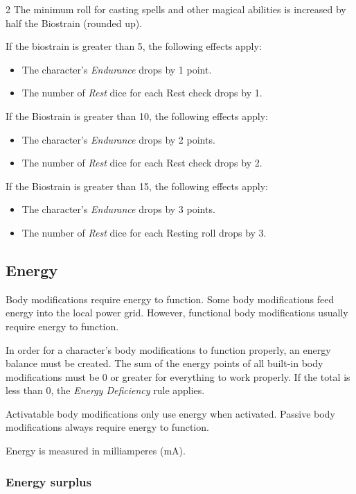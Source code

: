 \begin{multicols}{2}
The minimum roll for casting spells and other magical abilities is increased by half the Biostrain (rounded up).

If the biostrain is greater than 5, the following effects apply:
\begin{itemize}
    \item The character's \textit{Endurance} drops by 1 point.
    \item The number of \textit{Rest} dice for each Rest check drops by 1.
\end{itemize}

If the Biostrain is greater than 10, the following effects apply:
\begin{itemize}
    \item The character's \textit{Endurance} drops by 2 points.
    \item The number of \textit{Rest} dice for each Rest check drops by 2.
\end{itemize}

If the Biostrain is greater than 15, the following effects apply:
\begin{itemize}
    \item The character's \textit{Endurance} drops by 3 points.
    \item The number of \textit{Rest} dice for each Resting roll drops by 3.
\end{itemize}

\subsection{Energy}

Body modifications require energy to function. Some body modifications feed energy into the local power grid. However, functional body modifications usually require energy to function.

In order for a character's body modifications to function properly, an energy balance must be created. The sum of the energy points of all built-in body modifications must be 0 or greater for everything to work properly. If the total is less than 0, the \textit{Energy Deficiency} rule applies.

Activatable body modifications only use energy when activated. Passive body modifications always require energy to function.

Energy is measured in milliamperes (mA).

\subsubsection{Energy surplus}


\end{multicols}
